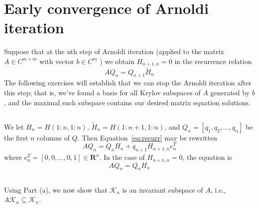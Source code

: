 \documentclass[11pt]{article} %
\begin{document}
\section{Early convergence of Arnoldi iteration}
Suppose that at the nth step of Arnoldi iteration (applied to the matrix $A \in C^{m \times m}$ with vector $b 
\in C^m$ )
we obtain $H_{n+1,n} = 0$ in the recurrence relation
\begin{equation}
AQ_n = Q_{n+1} \tilde{H}_{n}
\label{eq:recurr}
\end{equation}
The following exercises will establish that we can stop the Arnoldi iteration after this step; that is, we’ve found a basis for all Krylov subspaces of $A$ generated by $b$, and the maximal such subspace contains our
desired matrix equation solutions.

\subsection{} %
We let $H_n = H(1:n,1:n)$,  $\tilde{H}_n = H(1:n+1,1:n)$, and $Q_n = [q_1, q_2, ..., q_n]$ be the first $n$ columns of $Q$. Then Equation~\ref{eq:recurr} may be rewritten
\begin{equation}
A Q_n = Q_n H_n + q_{n+1} H_{n+1,n}e_n^T
\end{equation}
where $e_n^T = [0, 0 , ..., 0, 1] \in \mathbf{R}^n$. In the case of $H_{n+1,n} = 0$, the equation is
\begin{equation}
\boxed{A Q_n = Q_n H_n }
\end{equation}

\subsection{} %
Using Part (a), we now show that $\mathcal{K}_n$ is an invariant subspace of $A$, i.e., $A \mathcal{K}_n \subseteq \mathcal{K}_n$.
\end{document}
